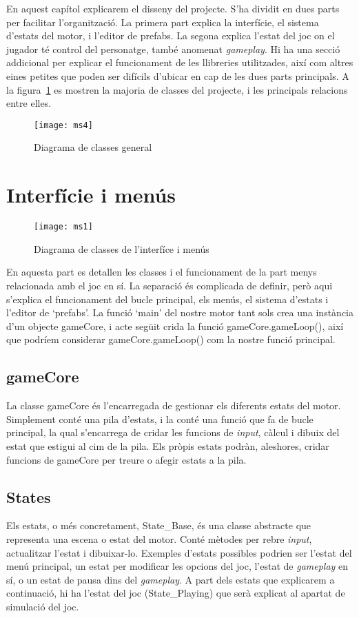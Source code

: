 En aquest capítol explicarem el disseny del projecte. 
S'ha dividit en dues parts per facilitar l'organització. 
La primera part explica la interfície, el sistema d'estats del motor, i l'editor de prefabs. 
La segona explica l'estat del joc on el jugador té control del personatge, també anomenat \textit{gameplay}. 
Hi ha una secció addicional per explicar el funcionament de les llibreries utilitzades, així com altres eines petites que poden ser difícils d'ubicar en cap de les dues parts principals.
A la figura~\ref{dc_general} es mostren la majoria de classes del projecte, i les principals relacions entre elles.
\pagebreak
\begin{figure}[H]
  \centering
  \texttt{[image: ms4]}
  \caption{Diagrama de classes general}
  \label{dc_general}
\end{figure}
\section{Interfície i menús}
  \begin{figure}[H]
    \centering
    \texttt{[image: ms1]}
    \caption{Diagrama de classes de l'interfíce i menús}
    \label{dc_menu}
  \end{figure}
En aquesta part es detallen les classes i el funcionament de la part menys relacionada amb el joc en sí. La separació és complicada de definir, però aqui s'explica el funcionament del bucle principal, els menús, el sistema d'estats i l'editor de `prefabs'. 
La funció `main' del nostre motor tant sols crea una instància d'un objecte gameCore, i acte següit crida la funció gameCore.gameLoop(), així que podríem considerar gameCore.gameLoop() com la nostre funció principal.
\subsection{gameCore}
La classe gameCore és l'encarregada de gestionar els diferents estats del motor. 
Simplement conté una pila d'estats, i la conté una funció que fa de bucle principal, la qual s'encarrega de cridar les funcions de \textit{input}, càlcul i dibuix del estat que estigui al cim de la pila.
Els pròpis estats podràn, aleshores, cridar funcions de gameCore per treure o afegir estats a la pila.

\subsection{States}
Els estats, o més concretament, State\_Base, és una classe abstracte que representa una escena o estat del motor. Conté mètodes per rebre \textit{input}, actualitzar l'estat i dibuixar-lo.
Exemples d'estats possibles podrien ser l'estat del menú principal, un estat per modificar les opcions del joc, l'estat de \textit{gameplay} en sí, o un estat de pausa dins del \textit{gameplay}.
A part dels estats que explicarem a continuació, hi ha l'estat del joc (State\_Playing) que serà explicat al apartat de simulació del joc.

